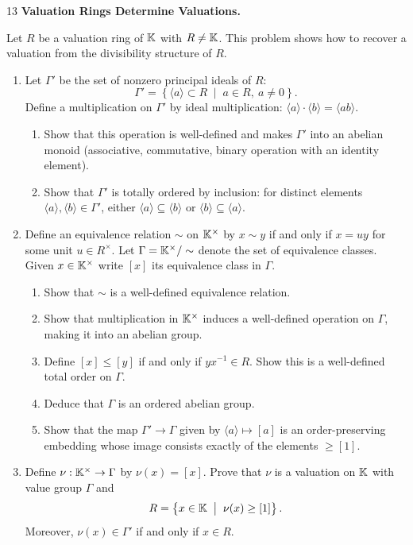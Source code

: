 \documentclass[Notebook.tex]{subfiles}
\begin{document}
    \begin{problem}{13}
    \textbf{Valuation Rings Determine Valuations.}

    Let $R$ be a valuation ring of $\mathbb K$ with $R \neq \mathbb K$. This problem shows how to recover a valuation from the divisibility structure of $R$.

    \begin{enumerate}[label=(\alph*),ref=\theenumi\alph*]
        \item Let $\Gamma'$ be the set of nonzero principal ideals of $R$:
        \[
        \Gamma' = \left\{\langle a\rangle \subset R \;\; \big|\;\; a \in R,\ a \neq 0\right\}.
        \]
        Define a multiplication on $\Gamma'$ by ideal multiplication: $\langle a\rangle \cdot \langle b\rangle = \langle ab\rangle$.
        \begin{enumerate}
            \item Show that this operation is well-defined and makes $\Gamma'$ into an abelian monoid (associative, commutative, binary operation with an identity element).
            \item Show that $\Gamma'$ is totally ordered by inclusion: for distinct elements $\langle a\rangle,\langle b\rangle \in \Gamma'$, either $\langle a\rangle \subseteq \langle b\rangle$ or $\langle b\rangle \subseteq \langle a\rangle$.
            \end{enumerate}

        \item Define an equivalence relation $\sim$ on $\mathbb K^\times$ by $x \sim y$ if and only if $x=uy$ for some unit $u \in R^{\times}$. Let $\Gamma = \mathbb K^\times / \sim$ denote the set of equivalence classes. Given $x\in \mathbb K^{\times}$ write $[x]$ its equivalence class in $\Gamma$.
        \begin{enumerate}[label=(\roman*),ref=\theenumi\roman*]
            \item Show that $\sim$ is a well-defined equivalence relation.
            \item Show that multiplication in $\mathbb K^\times$ induces a well-defined operation on $\Gamma$, making it into an abelian group.
            \item Define $[x] \leq [y]$ if and only if $yx^{-1} \in R$. Show this is a well-defined total order on $\Gamma$.
            \item Deduce that $\Gamma$ is an ordered abelian group.
            \item Show that the map $\Gamma' \to \Gamma$ given by $\langle a \rangle \mapsto [a]$ is an order-preserving embedding whose image consists exactly of the elements $\ge [1]$.
        \end{enumerate}
        
        \item Define $\nu:\mathbb K^{\times} \to \Gamma$ by $\nu(x) = [x]$. Prove that $\nu$ is a valuation on $\mathbb K$ with value group $\Gamma$ and 
        \[
        R = \left\{ x \in \mathbb K \;\; \big| \;\; \nu(x) \geq [1] \right\}.
        \]
        Moreover, $\nu(x) \in \Gamma'$ if and only if $x \in R$. 
        \end{enumerate}
  \end{problem}
\end{document}
